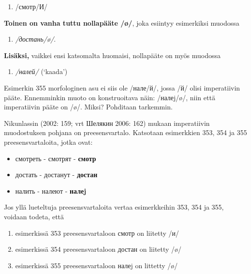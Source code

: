 \documentclass[]{scrartcl}
\providecommand{\tightlist}{%
  \setlength{\itemsep}{0pt}\setlength{\parskip}{0pt}}
\begin{document}
\begin{enumerate}
\def\labelenumi{(\arabic{enumi})}
\setcounter{enumi}{352}
\tightlist
\item
  /смотр/И/
\end{enumerate}

\textbf{Toinen on vanha tuttu nollapääte /ø/}, joka esiintyy esimerkiksi
muodossa

\begin{enumerate}
\def\labelenumi{(\arabic{enumi})}
\setcounter{enumi}{353}
\tightlist
\item
  \emph{/достань/ø/}.
\end{enumerate}

\textbf{Lisäksi,} vaikkei ensi katsomalta huomaisi, nollapääte on myös
muodossa

\begin{enumerate}
\def\labelenumi{(\arabic{enumi})}
\setcounter{enumi}{354}
\tightlist
\item
  \emph{/налей/} (`kaada')
\end{enumerate}

Esimerkin 355 morfologinen asu ei siis ole /нале/й/, jossa /й/ olisi
imperatiivin pääte. Ennemminkin muoto on konstruoitava näin: /налеj/ø/,
niin että imperatiivin pääte on /ø/. Miksi? Pohditaan tarkemmin.

Nikunlassin (2002: 159; vrt Шелякин 2006: 162) mukaan imperatiivin
muodostuksen pohjana on preesensvartalo. Katsotaan esimerkkien 353, 354
ja 355 preesensvartaloita, jotka ovat:

\begin{itemize}
\tightlist
\item
  смотреть - смотрят - \textbf{смотр}
\item
  достать - достанут - \textbf{достан}
\item
  налить - налеют - \textbf{налеj}
\end{itemize}

Jos yllä lueteltuja preesensvartaloita vertaa esimerkkeihin 353, 354 ja
355, voidaan todeta, että

\begin{enumerate}
\def\labelenumi{\arabic{enumi}.}
\tightlist
\item
  esimerkissä 353 preesensvartaloon смотр on liitetty /и/
\item
  esimerkissä 354 preesensvartaloon достан on liitetty /ø/
\item
  esimerkissä 355 preesensvartaloon налеj on littetty /ø/
\end{enumerate}
\end{document}
